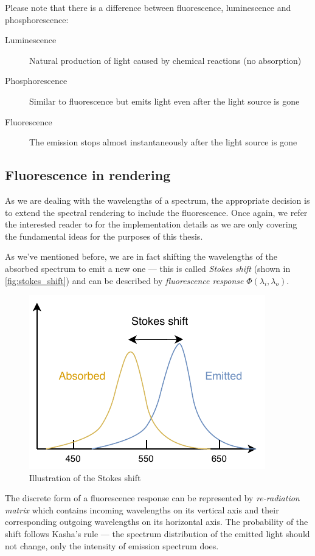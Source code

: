 Please note that there is a difference between fluorescence, luminescence and phosphorescence:

\begin{description}
	\item[Luminescence] Natural production of light caused by chemical reactions (no absorption)
	\item[Phosphorescence] Similar to fluorescence but emits light even after the light source is gone
	\item[Fluorescence] The emission stops almost instantaneously after the light source is gone
\end{description}

\subsection{Fluorescence in rendering}
As we are dealing with the wavelengths of a spectrum, the appropriate decision is to extend the spectral rendering to include the fluorescence. Once again, we refer the interested reader to \citet{mojzik2018handling} for the implementation details as we are only covering the fundamental ideas for the purposes of this thesis.

As we've mentioned before, we are in fact shifting the wavelengths of the absorbed spectrum to emit a new one --- this is called \emph{Stokes shift} (shown in \autoref{fig:stokes_shift}) and can be described by \emph{fluorescence response} $\Phi(\lambda_i,\lambda_o)$.

\begin{figure}
	\centering
	\includegraphics[width=0.7\linewidth]{img/stokes_shift.pdf}
	\caption{Illustration of the Stokes shift}
	\label{fig:stokes_shift}
\end{figure}

The discrete form of a fluorescence response can be represented by \emph{re-radiation matrix} which contains incoming wavelengths on its vertical axis and their corresponding outgoing wavelengths on its horizontal axis. The probability of the shift follows Kasha's rule --- the spectrum distribution of the emitted light should not change, only the intensity of emission spectrum does.

